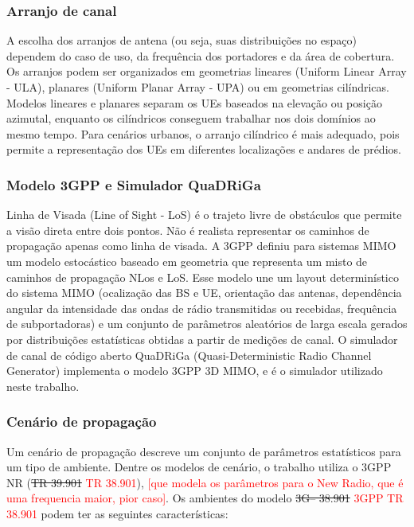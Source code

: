 \subsubsection{Arranjo de canal} 

A escolha dos arranjos de antena (ou seja, suas distribuições no espaço) dependem do caso de uso, da frequência dos portadores e da área de cobertura. Os arranjos podem ser organizados em geometrias lineares (Uniform Linear Array - ULA), planares (Uniform Planar Array - UPA) ou em geometrias cilíndricas. Modelos lineares e planares separam os UEs baseados na elevação ou posição azimutal, enquanto os cilíndricos conseguem trabalhar nos dois domínios ao mesmo tempo. Para cenários urbanos, o arranjo cilíndrico é mais adequado, pois permite a representação dos UEs em diferentes localizações e andares de prédios. 

\subsubsection{Modelo 3GPP e Simulador QuaDRiGa}

Linha de Visada (Line of Sight - LoS) é o trajeto livre de obstáculos que permite a visão direta entre dois pontos. Não é realista representar os caminhos de propagação apenas como linha de visada. A 3GPP definiu para sistemas MIMO um modelo estocástico baseado em geometria que representa um misto de caminhos de propagação NLos e LoS. Esse modelo une um layout determinístico do sistema MIMO (ocalização das BS e UE, orientação das antenas, dependência angular da intensidade das ondas de rádio transmitidas ou recebidas, frequência de subportadoras) e um conjunto de parâmetros aleatórios de larga escala gerados por distribuições estatísticas obtidas a partir de medições de canal. O simulador de canal de código aberto QuaDRiGa (Quasi-Deterministic Radio Channel Generator) implementa o modelo 3GPP 3D MIMO, e é o simulador utilizado neste trabalho. 



\subsubsection{Cenário de propagação}
Um cenário de propagação descreve um conjunto de parâmetros estatísticos para um tipo de ambiente. Dentre os modelos de cenário, o trabalho utiliza o 3GPP NR (\sout{TR 39.901} \textcolor{red}{TR 38.901}), \textcolor{red}{[que modela os parâmetros para o New Radio, que é uma frequencia maior, pior caso]}. Os ambientes do modelo \sout{3G-- 38.901} \textcolor{red}{3GPP TR 38.901} podem ter as seguintes características: 

